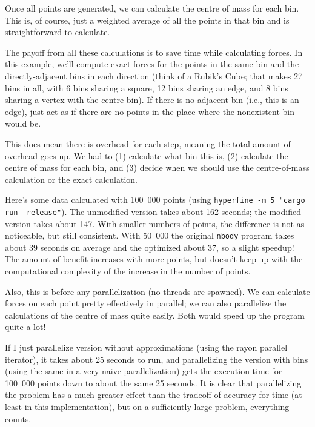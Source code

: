\documentclass[a4paper]{report}
\begin{document}
Once all points are generated, we can calculate the centre of mass for each bin. This is, of course, just a weighted average of all the points in that bin and is straightforward to calculate.

The payoff from all these calculations is to save time while
calculating forces. In this example, we'll compute exact
forces for the points in the same bin and the directly-adjacent bins
in each direction (think of a Rubik's Cube; that makes 27 bins in all,
with 6 bins sharing a square, 12 bins sharing an edge, and 8 bins
sharing a vertex with the centre bin). If there is no adjacent bin 
(i.e., this is an edge), just act as if there are no points 
in the place where the nonexistent bin would be. 

This does mean there is overhead for each step, meaning the total amount of overhead goes up. We had to (1) calculate what bin this is, (2) calculate the centre of mass for each bin, and (3) decide when we should use the centre-of-mass calculation or the exact calculation.

Here's some data calculated with 100~000 points (using \texttt{hyperfine -m 5 "cargo run --release"}). The unmodified version takes about 162 seconds; the modified version takes about 147. With smaller numbers of points, the difference is not as noticeable, but still consistent. With 50~000 the original \texttt{nbody} program takes about 39 seconds on average and the optimized about 37, so a slight speedup! The amount of benefit increases with more points, but doesn't keep up with the computational complexity of the increase in the number of points.

Also, this is before any parallelization (no threads are spawned). We can calculate forces on each point pretty effectively in parallel; we can also parallelize the calculations of the centre of mass quite easily. Both would speed up the program quite a lot! 

If I just parallelize version without approximations (using the rayon parallel iterator), it takes about 25 seconds to run, and parallelizing the version with bins (using the same in a very naive parallelization) gets the execution time for 100~000 points down to about the same 25 seconds. It is clear that parallelizing the problem has a much greater effect than the tradeoff of accuracy for time (at least in this implementation), but on a sufficiently large problem, everything counts.
\end{document}
